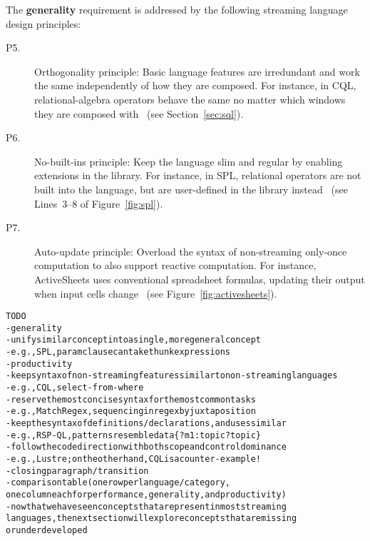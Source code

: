 The \textbf{generality} requirement is addressed by the following
streaming language design principles:
\begin{description}
  \item[P5.] Orthogonality principle: Basic language features are
    irredundant and work the same independently of how they are
    composed. For instance, in CQL, relational-algebra operators
    behave the same no matter which windows they are composed
    with~\cite{arasu_babu_widom_2006} (see Section~\ref{sec:sql}).
  \item[P6.] No-built-ins principle: Keep the language slim and
    regular by enabling extensions in the library. For instance, in
    SPL, relational operators are not built into the language, but are
    user-defined in the library
    instead~\cite{hirzel_schneider_gedik_2017} (see \mbox{Lines 3--8}
    of Figure~\ref{fig:spl}).
  \item[P7.] Auto-update principle: Overload the syntax of
    non-streaming only-once computation to also support reactive
    computation. For instance, ActiveSheets uses conventional
    spreadsheet formulas, updating their output when input cells
    change~\cite{vaziri_et_al_2014} (see
    Figure~\ref{fig:activesheets}).
\end{description}

\begin{alltt}TODO\scriptsize
- generality
  - unify similar concept into a single, more general concept
    - e.g., SPL, param clause can take thunk expressions
- productivity
  - keep syntax of non-streaming features similar to non-streaming languages
    - e.g., CQL, select-from-where
  - reserve the most concise syntax for the most common tasks
    - e.g., MatchRegex, sequencing in regex by juxtaposition
  - keep the syntax of definitions/declarations, and uses similar
    - e.g., RSP-QL, patterns resemble data \{ ?m1 :topic ?topic \}
  - follow the code direction with both scope and control dominance
    - e.g., Lustre; on the other hand, CQL is a counter-example!
- closing paragraph / transition
  - comparison table (one row per language/category,
    one column each for performance, generality, and productivity)
  - now that we have seen concepts that are present in most streaming
    languages, the next section will explore concepts that are missing
    or underdeveloped
\end{alltt}
